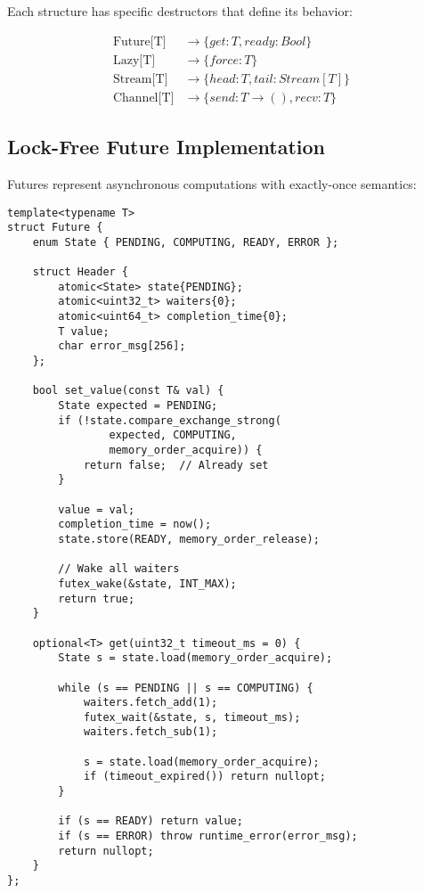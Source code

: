 \documentclass[letterpaper,twocolumn,10pt]{article}
\begin{document}
Each structure has specific destructors that define its behavior:

\begin{align}
\text{Future[T]} &\rightarrow \{get: T, ready: Bool\} \\
\text{Lazy[T]} &\rightarrow \{force: T\} \\
\text{Stream[T]} &\rightarrow \{head: T, tail: Stream[T]\} \\
\text{Channel[T]} &\rightarrow \{send: T \rightarrow (), recv: T\}
\end{align}

\subsection{Lock-Free Future Implementation}

Futures represent asynchronous computations with exactly-once semantics:

\begin{lstlisting}[caption={Future State Machine}]
template<typename T>
struct Future {
    enum State { PENDING, COMPUTING, READY, ERROR };
    
    struct Header {
        atomic<State> state{PENDING};
        atomic<uint32_t> waiters{0};
        atomic<uint64_t> completion_time{0};
        T value;
        char error_msg[256];
    };
    
    bool set_value(const T& val) {
        State expected = PENDING;
        if (!state.compare_exchange_strong(
                expected, COMPUTING,
                memory_order_acquire)) {
            return false;  // Already set
        }
        
        value = val;
        completion_time = now();
        state.store(READY, memory_order_release);
        
        // Wake all waiters
        futex_wake(&state, INT_MAX);
        return true;
    }
    
    optional<T> get(uint32_t timeout_ms = 0) {
        State s = state.load(memory_order_acquire);
        
        while (s == PENDING || s == COMPUTING) {
            waiters.fetch_add(1);
            futex_wait(&state, s, timeout_ms);
            waiters.fetch_sub(1);
            
            s = state.load(memory_order_acquire);
            if (timeout_expired()) return nullopt;
        }
        
        if (s == READY) return value;
        if (s == ERROR) throw runtime_error(error_msg);
        return nullopt;
    }
};
\end{lstlisting}
\end{document}
